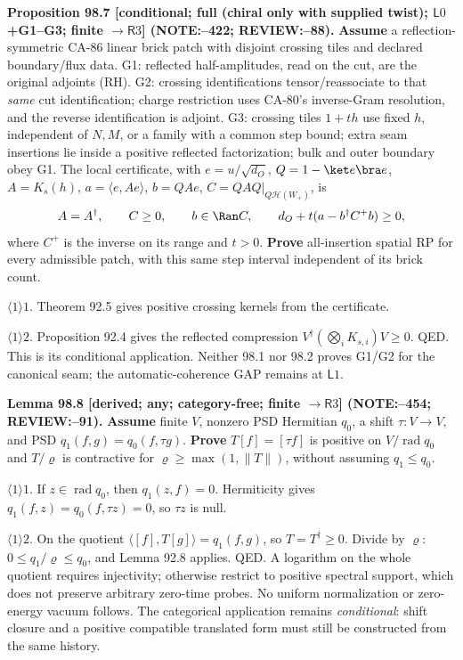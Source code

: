 \textbf{Proposition 98.7 [conditional; full (chiral only with supplied twist); \(\mathsf L0\)+G1--G3; finite \(\to\mathsf R3\)] (NOTE:--422; REVIEW:--88).}
\textbf{Assume} a reflection-symmetric CA-86 linear brick patch with disjoint crossing tiles and declared boundary/flux data.
G1: reflected half-amplitudes, read on the cut, are the original adjoints (RH).
G2: crossing identifications tensor/reassociate to that \emph{same} cut identification; charge restriction uses
CA-80's inverse-Gram resolution, and the reverse identification is adjoint.
G3: crossing tiles \(1+th\) use fixed \(h\), independent of \(N,M\), or a family with a common step bound;
extra seam insertions lie inside a positive reflected factorization; bulk and outer boundary obey G1.
The local certificate, with \(e=u/\sqrt{d_O}\), \(Q=1-\ket e\bra e\), \(A=K_s(h)\),
\(a=\langle e,Ae\rangle\), \(b=QAe\), \(C=QAQ|_{Q\mathcal H(W_+)}\), is
\[
 A=A^\dagger,\qquad C\ge0,\qquad b\in\Ran C,\qquad
 d_O+t(a-b^\dagger C^+b)\ge0,
\]
where \(C^+\) is the inverse on its range and \(t>0\). \textbf{Prove} all-insertion spatial RP for every
admissible patch, with this same step interval independent of its brick count.
\par\(\langle1\rangle1\). Theorem 92.5 gives positive crossing kernels from the certificate.
\par\(\langle1\rangle2\). Proposition 92.4 gives the reflected compression
\(V^\dagger(\bigotimes_iK_{s,i})V\ge0\). QED. This is its conditional application.
Neither 98.1 nor 98.2 proves G1/G2 for the canonical seam; the automatic-coherence GAP remains at \(\mathsf L1\).

\textbf{Lemma 98.8 [derived; any; category-free; finite \(\to\mathsf R3\)] (NOTE:--454; REVIEW:--91).}
\textbf{Assume} finite \(V\), nonzero PSD Hermitian \(q_0\), a shift \(\tau:V\to V\), and PSD
\(q_1(f,g)=q_0(f,\tau g)\). \textbf{Prove} \(T[f]=[\tau f]\) is positive on \(V/\operatorname{rad}q_0\)
and \(T/\varrho\) is contractive for \(\varrho\ge\max(1,\|T\|)\), without assuming \(q_1\le q_0\).
\par\(\langle1\rangle1\). If \(z\in\operatorname{rad}q_0\), then \(q_1(z,f)=0\). Hermiticity gives
\(q_1(f,z)=q_0(f,\tau z)=0\), so \(\tau z\) is null.
\par\(\langle1\rangle2\). On the quotient \(\langle[f],T[g]\rangle=q_1(f,g)\), so \(T=T^\dagger\ge0\).
Divide by \(\varrho\): \(0\le q_1/\varrho\le q_0\), and Lemma 92.8 applies. QED.
A logarithm on the whole quotient requires injectivity; otherwise restrict to positive spectral support,
which does not preserve arbitrary zero-time probes. No uniform normalization or zero-energy vacuum follows.
The categorical application remains \emph{conditional}: shift closure and a positive compatible translated
form must still be constructed from the same history.

